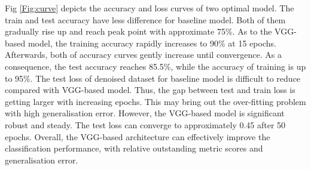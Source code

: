 Fig \ref{Fig:curve} depicts the accuracy and loss curves of two optimal model. The train and test accuracy have less difference for baseline model. Both of them gradually rise up and reach peak point with approximate 75\%. As to the VGG-based model, the training accuracy rapidly increases to 90\% at 15 epochs. Afterwards, both of accuracy curves gently increase until convergence. As a consequence, the test accuracy reaches 85.5\%, while the accuracy of training is up to 95\%. The test loss of denoised dataset for baseline model is difficult to reduce compared with VGG-based model. Thus, the gap between test and train loss is getting larger with increasing epochs. This may bring out the over-fitting problem with high generalisation error. However, the VGG-based model is significant robust and steady. The test loss can converge to approximately 0.45 after 50 epochs. Overall, the VGG-based architecture can effectively improve the classification performance, with relative outstanding metric scores and generalisation error.\par

